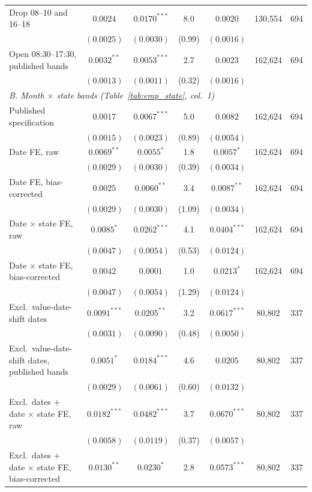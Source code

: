 \begin{tabular}{lcccccc}
Drop 08--10 and 16--18 & $0.0024$ & $0.0170^{***}$ & 8.0 & $0.0020$ & 130,554 & 694 \\
 & $(0.0025)$ & $(0.0030)$ & (0.99) & $(0.0016)$ & & \\
Open 08:30--17:30, published bands & $0.0032^{**}$ & $0.0053^{***}$ & 2.7 & $0.0023$ & 162,624 & 694 \\
 & $(0.0013)$ & $(0.0011)$ & (0.32) & $(0.0016)$ & & \\
\midrule
\multicolumn{7}{l}{\emph{B. Month $\times$ state bands (Table~\ref{tab:emp_state}, col.\ 1)}} \\
Published specification & $0.0017$ & $0.0067^{***}$ & 5.0 & $0.0082$ & 162,624 & 694 \\
 & $(0.0015)$ & $(0.0023)$ & (0.89) & $(0.0054)$ & & \\
Date FE, raw & $0.0069^{**}$ & $0.0055^{*}$ & 1.8 & $0.0057^{*}$ & 162,624 & 694 \\
 & $(0.0029)$ & $(0.0030)$ & (0.39) & $(0.0034)$ & & \\
Date FE, bias-corrected & $0.0025$ & $0.0060^{**}$ & 3.4 & $0.0087^{**}$ & 162,624 & 694 \\
 & $(0.0029)$ & $(0.0030)$ & (1.09) & $(0.0034)$ & & \\
Date $\times$ state FE, raw & $0.0085^{*}$ & $0.0262^{***}$ & 4.1 & $0.0404^{***}$ & 162,624 & 694 \\
 & $(0.0047)$ & $(0.0054)$ & (0.53) & $(0.0124)$ & & \\
Date $\times$ state FE, bias-corrected & $0.0042$ & $0.0001$ & 1.0 & $0.0213^{*}$ & 162,624 & 694 \\
 & $(0.0047)$ & $(0.0054)$ & (1.29) & $(0.0124)$ & & \\
Excl.\ value-date-shift dates & $0.0091^{***}$ & $0.0205^{**}$ & 3.2 & $0.0617^{***}$ & 80,802 & 337 \\
 & $(0.0031)$ & $(0.0090)$ & (0.48) & $(0.0050)$ & & \\
Excl.\ value-date-shift dates, published bands & $0.0051^{*}$ & $0.0184^{***}$ & 4.6 & $0.0205$ & 80,802 & 337 \\
 & $(0.0029)$ & $(0.0061)$ & (0.60) & $(0.0132)$ & & \\
Excl.\ dates + date $\times$ state FE, raw & $0.0182^{***}$ & $0.0482^{***}$ & 3.7 & $0.0670^{***}$ & 80,802 & 337 \\
 & $(0.0058)$ & $(0.0119)$ & (0.37) & $(0.0057)$ & & \\
Excl.\ dates + date $\times$ state FE, bias-corrected & $0.0130^{**}$ & $0.0230^{*}$ & 2.8 & $0.0573^{***}$ & 80,802 & 337 \\

\end{tabular}
